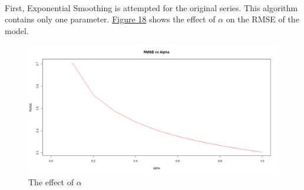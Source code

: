 \documentclass[12pt]{article}
\begin{document}
\paragraph{}
First, Exponential Smoothing is attempted for the original series. This algorithm contains only one parameter. \href{figure18}{Figure 18} shows the effect of $\alpha$ on the RMSE of the model.
\begin{figure}[H]
  \centering
  \includegraphics[width=\linewidth]{figure18.png}
  \caption{The effect of $\alpha$}
  \label{fig:figure18}
\end{figure}
\end{document}
